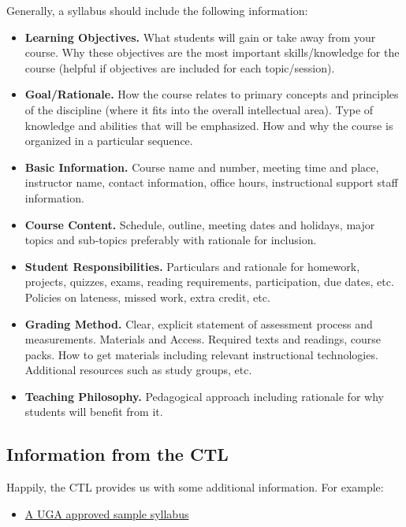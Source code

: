 Generally, a syllabus should include the following information:

\begin{itemize}
\item \textbf{Learning Objectives.} What students will gain or take away from your course. Why these objectives are the most important skills/knowledge for the course (helpful if objectives are included for each topic/session).
  
\item \textbf{Goal/Rationale.} How the course relates to primary concepts and principles of the discipline (where it fits into the overall intellectual area). Type of knowledge and abilities that will be emphasized. How and why the course is organized in a particular sequence.

\item \textbf{Basic Information.} Course name and number, meeting time and place, instructor name, contact information, office hours, instructional support staff information.

\item \textbf{Course Content.} Schedule, outline, meeting dates and holidays, major topics and sub-topics preferably with rationale for inclusion.
  
\item \textbf{Student Responsibilities.} Particulars and rationale for homework, projects, quizzes, exams, reading requirements, participation, due dates, etc. Policies on lateness, missed work, extra credit, etc.

\item \textbf{Grading Method.} Clear, explicit statement of assessment process and measurements.
  Materials and Access. Required texts and readings, course packs. How to get materials including relevant instructional technologies. Additional resources such as study groups, etc.
  
\item \textbf{Teaching Philosophy.} Pedagogical approach including rationale for why students will benefit from it.
\end{itemize}

\subsection{Information from the CTL}
\label{sec:information-from-ctl}

Happily, the CTL provides us with some additional information.  For example:
\begin{itemize}
\item \href{https://github.com/WilliamOlsen/GRSC-2018/blob/master/Lectures/Week-2/UGA-Syllabus-Template-Instructors-of-GRSC7770.pdf}{A UGA approved sample syllabus}
\end{itemize}


